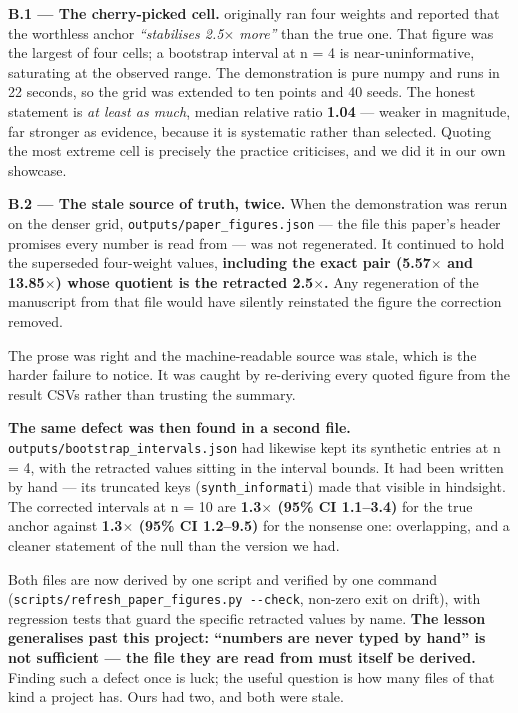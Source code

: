 \textbf{B.1 --- The cherry-picked cell.}  originally ran four weights and reported that the
worthless anchor \emph{``stabilises 2.5$\times$ more''} than the true one. That figure was the largest of four
cells; a bootstrap interval at n = 4 is near-uninformative, saturating at the observed range.
The demonstration is pure numpy and runs in 22 seconds, so the grid was extended to ten points
and 40 seeds. The honest statement is \emph{at least as much}, median relative ratio \textbf{1.04} --- weaker
in magnitude, far stronger as evidence, because it is systematic rather than selected. Quoting
the most extreme cell is precisely the practice  criticises, and we did it in our own
showcase.

\textbf{B.2 --- The stale source of truth, twice.} When the demonstration was rerun on the denser grid,
\texttt{outputs/paper\_figures.json} --- the file this paper's header promises every number is read from ---
was not regenerated. It continued to hold the superseded four-weight values, \textbf{including the
exact pair (5.57$\times$ and 13.85$\times$) whose quotient is the retracted 2.5$\times$.} Any regeneration of the
manuscript from that file would have silently reinstated the figure the correction removed.

The prose was right and the machine-readable source was stale, which is the harder failure to
notice. It was caught by re-deriving every quoted figure from the result CSVs rather than
trusting the summary.

\textbf{The same defect was then found in a second file.} \texttt{outputs/bootstrap\_intervals.json} had
likewise kept its synthetic entries at n = 4, with the retracted values sitting in the interval
bounds. It had been written by hand --- its truncated keys (\texttt{synth\_informati}) made that visible in
hindsight. The corrected intervals at n = 10 are \textbf{1.3$\times$ (95\% CI 1.1--3.4)} for the true anchor
against \textbf{1.3$\times$ (95\% CI 1.2--9.5)} for the nonsense one: overlapping, and a cleaner statement of
the null than the version we had.

Both files are now derived by one script and verified by one command
(\texttt{scripts/refresh\_paper\_figures.py\ -\/-check}, non-zero exit on drift), with regression tests that
guard the specific retracted values by name. \textbf{The lesson generalises past this project:
``numbers are never typed by hand'' is not sufficient --- the file they are read from must itself be
derived.} Finding such a defect once is luck; the useful question is how many files of that kind
a project has. Ours had two, and both were stale.

